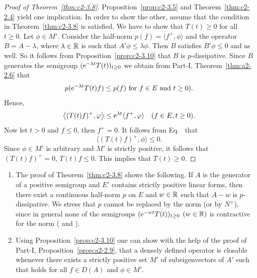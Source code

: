 \begin{proof}[Proof of Theorem~\ref{thm:c2-3.8}]
Proposition~\ref{prop:c2-3.5} and Theorem~\ref{thm:c2-2.4}   yield one implication. 
In order to show the other, assume that the condition in
Theorem~\ref{thm:c2-3.8}   is satisfied. 
We have to show that $T(t) \geq 0$ for all $t \geq 0$.
Let $\phi \in M'$. 
Consider the half-norm $p(f) = \langle f^{+},\phi \rangle$ and the operator $B = A - \lambda$, where $\lambda \in \mathbb{R}$ is such that $A'\phi \leq \lambda\phi$. 
Then $B$ satisfies $B'\phi \leq 0$ and    as well. 
So it follows from Proposition~\ref{prop:c2-3.10}   that $B$ is $p$-dissipative.
Since $B$ generates the semigroup $(\eu^{-\lambda t}T(t))_{t \geq 0}$ we obtain from Part-I, Theorem~\ref{thm:a2-2.6} that 
\[
p(\eu^{-\lambda t}T(t)f) \leq p(f) \text{ for } f \in E \text{ and } t\geq 0) .
\]
Hence,
\begin{equation} \label{eq:c2-3.5}
\left\langle (T(t)f)^{+}, \phi \right\rangle \leq \eu^{\lambda t} \langle f^{+}, \phi \rangle \quad (f \in E, t \geq 0).
\end{equation}
Now let $t > 0$ and $f \leq 0$, then $f^{+} = 0$. 
It follows from  Eq.~ that 
\[
\langle (T(t)f)^{+},\phi \rangle \leq 0 .
\]
Since $\phi \in M'$ is arbitrary and $M'$ is strictly positive, it follows that $(T(t)f)^{+} = 0$, \ie $T(t)f \leq 0$. 
This implies that $T(t) \geq 0$.
\end{proof}
\begin{remark}\label{rem:c2-3.11}
\begin{enumerate}[\upshape (i), wide, labelindent=.25em]%
\item \label{rem:c2-3.11-1}
The proof of Theorem~\ref{thm:c2-3.8}   shows the following. 
If\/ $A$ is the generator of a positive semigroup and $E'$ contains strictly
positive linear forms, then there exist a continuous half-norm $p$ on
$E$ and $w \in \mathbb{R}$ such that $A - w$ is $p$-dissipative. 
We stress that $p$ cannot be replaced by the norm (or by $N^{+}$), since in general none of the semigroups $(\eu^{-wt}T(t))_{t \geq 0}$ $(w \in \mathbb{R})$ is contractive for the norm (\cf \textcite{derndinger:1984} and \textcite{battydavies:1983}).
\item  \label{rem:c2-3.11-2}
Using Proposition~\ref{prop:c2-3.10}   one can show with the help of the proof of 
Part-I, Proposition~\ref{prop:a2-2.9}, that a densely defined operator is closable whenever
there exists a strictly positive set $M'$ of subeigenvectors of\/ $A'$
such that    holds for all $f \in D(A)$ and $\phi \in M'$.
\end{enumerate}
\end{remark}
